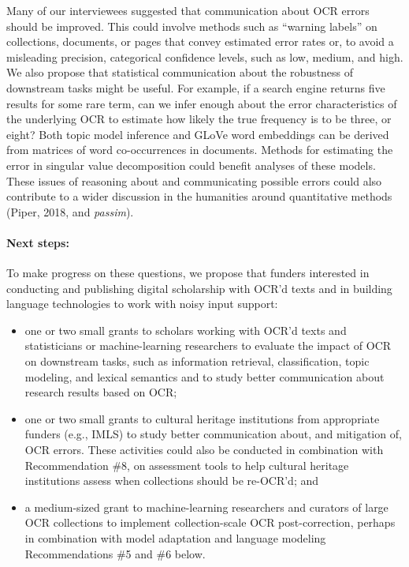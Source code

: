 \documentclass[twoside,11pt]{report}
\begin{document}
Many of our interviewees suggested that communication about OCR errors should be improved. This could involve methods such as ``warning labels'' on collections, documents, or pages that convey estimated error rates or, to avoid a misleading precision, categorical confidence levels, such as low, medium, and high. We also propose that statistical communication about the robustness of downstream tasks might be useful. For example, if a search engine returns five results for some rare term, can we infer enough about the error characteristics of the underlying OCR to estimate how likely the true frequency is to be three, or eight? Both topic model inference and GLoVe word embeddings can be derived from matrices of word co-occurrences in documents. Methods for estimating the error in singular value decomposition could benefit analyses of these models. These issues of reasoning about and communicating possible errors could also contribute to a wider discussion in the humanities around quantitative methods (Piper, 2018, and \emph{passim}).

\paragraph{Next steps:} To make progress on these questions, we propose that funders interested in conducting and publishing digital scholarship with OCR'd texts and in building language technologies to work with noisy input support:
\begin{itemize}

\item one or two small grants to scholars working with OCR'd texts and statisticians or machine-learning researchers to evaluate the impact of OCR on downstream tasks, such as information retrieval, classification, topic modeling, and lexical semantics and to study better communication about research results based on OCR;

\item one or two small grants to cultural heritage institutions from appropriate funders (e.g., IMLS) to study better communication about, and mitigation of, OCR errors. These activities could also be conducted in combination with Recommendation \#8, on assessment tools to help cultural heritage institutions assess when collections should be re-OCR'd; and

\item a medium-sized grant to machine-learning researchers and curators of large OCR collections to implement collection-scale OCR post-correction, perhaps in combination with model adaptation and language modeling Recommendations \#5 and \#6 below.

\end{itemize}
\end{document}
